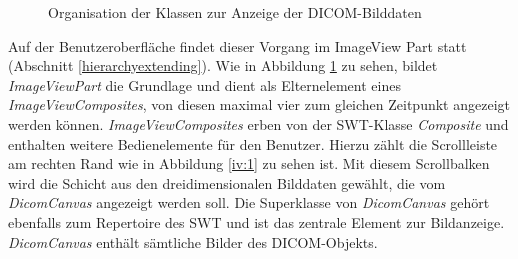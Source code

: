 \begin{figure}[htbp]
  \vspace{0.5cm}
  \centering
  \caption{Organisation der Klassen zur Anzeige der DICOM-Bilddaten}
  \label{imageview}
  \vspace{0.5cm}
\end{figure}

Auf der Benutzeroberfläche findet dieser Vorgang im ImageView Part statt (Abschnitt \ref{hierarchyextending}). Wie in Abbildung \ref{imageview} zu sehen, bildet \textit{ImageViewPart} die Grundlage und dient als Elternelement eines \textit{ImageViewComposites}, von diesen maximal vier zum gleichen Zeitpunkt angezeigt werden können. \textit{ImageViewComposites} erben von der SWT-Klasse \textit{Composite} und enthalten weitere Bedienelemente für den Benutzer. Hierzu zählt die Scrollleiste am rechten Rand wie in Abbildung \ref{iv:1} zu sehen ist. Mit diesem Scrollbalken wird die Schicht aus den dreidimensionalen Bilddaten gewählt, die vom \textit{DicomCanvas} angezeigt werden soll. Die Superklasse von \textit{DicomCanvas} gehört ebenfalls zum Repertoire des SWT und ist das zentrale Element zur Bildanzeige. \textit{DicomCanvas} enthält sämtliche Bilder des DICOM-Objekts.

